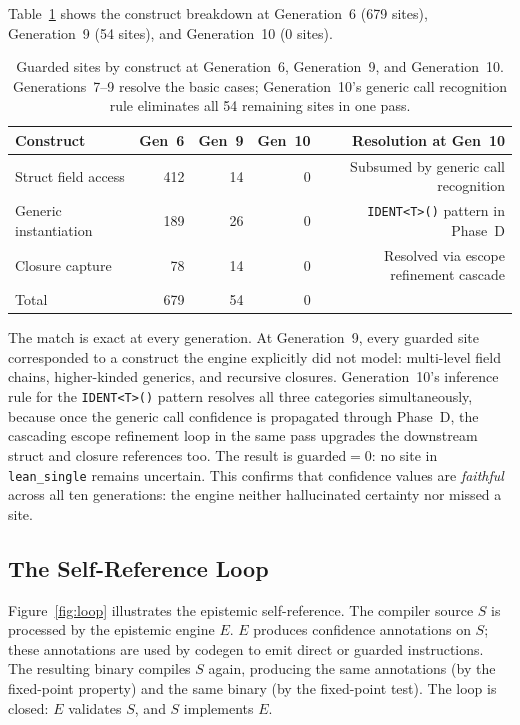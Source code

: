 \documentclass[acmsmall,screen,review,anonymous]{acmart}
\newcommand{\lean}{\texttt{lean\_single}\xspace}
\begin{document}
Table~\ref{tab:guarded-breakdown} shows the construct breakdown at
Generation~6 (679 sites), Generation~9 (54 sites), and Generation~10 (0 sites).

\begin{table}[h]
\centering
\small
\begin{tabular}{@{}lrrrr@{}}
\toprule
Construct & Gen~6 & Gen~9 & Gen~10 & Resolution at Gen~10 \\
\midrule
Struct field access   & 412 & 14 &  0 & Subsumed by generic call recognition \\
Generic instantiation & 189 & 26 &  0 & \texttt{IDENT\textless T\textgreater()} pattern in Phase~D \\
Closure capture       &  78 & 14 &  0 & Resolved via escope refinement cascade \\
\midrule
Total                 & 679 & 54 &  0 & \\
\bottomrule
\end{tabular}
\caption{%
  Guarded sites by construct at Generation~6, Generation~9, and Generation~10.
  Generations~7--9 resolve the basic cases; Generation~10's generic call
  recognition rule eliminates all 54 remaining sites in one pass.
}
\label{tab:guarded-breakdown}
\end{table}

The match is exact at every generation.
At Generation~9, every guarded site corresponded to a construct the engine
explicitly did not model: multi-level field chains, higher-kinded generics,
and recursive closures.
Generation~10's inference rule for the \texttt{IDENT\textless T\textgreater()}
pattern resolves all three categories simultaneously, because once the generic
call confidence is propagated through Phase~D, the cascading escope refinement
loop in the same pass upgrades the downstream struct and closure references too.
The result is $\text{guarded} = 0$: no site in \lean remains uncertain.
This confirms that confidence values are \emph{faithful} across all ten
generations: the engine neither hallucinated certainty nor missed a site.

\subsection{The Self-Reference Loop}

Figure~\ref{fig:loop} illustrates the epistemic self-reference.
The compiler source $S$ is processed by the epistemic engine $E$.
$E$ produces confidence annotations on $S$; these annotations are used
by codegen to emit direct or guarded instructions.
The resulting binary compiles $S$ again, producing the same annotations
(by the fixed-point property) and the same binary (by the fixed-point
test).
The loop is closed: $E$ validates $S$, and $S$ implements $E$.
\end{document}
